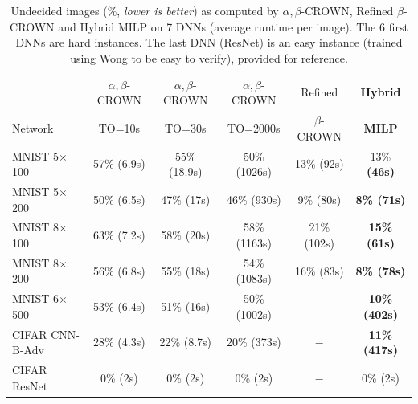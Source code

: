 \begin{table}[t!]
	\centering
		\caption{Undecided images ($\%$, {\em lower is better}) as computed by $\alpha,\beta$-CROWN, Refined $\beta$-CROWN and Hybrid MILP on 7 DNNs (average runtime per image). The 6 first DNNs are hard instances. The last DNN (ResNet) is an easy instance (trained using Wong to be easy to verify), provided for reference.
	}
	\label{table_hybrid}
	\begin{tabular}{||l||c|c|c||c||c||}
		\hline \hline
		 & $\alpha,\beta$-CROWN & $\alpha,\beta$-CROWN & $\alpha,\beta$-CROWN & Refined & \bf Hybrid \\ 
		 Network & TO=10s & TO=30s & TO=2000s & $\beta$-CROWN & \bf MILP \\ 
		\hline
		MNIST 5$\times$100 & 57\% (6.9s) & 55\% (18.9s) & 50\% (1026s) & 13\% 
		(92s) & 13\% \bf (46s) \\ \hline
		MNIST 5$\times$200 & 50\% (6.5s) & 47\% (17s) & 46\% (930s) & 9\% (80s) & \bf 8\% (71s) \\ \hline
		MNIST 8$\times$100 & 63\% (7.2s) & 58\% (20s) & 58\% (1163s) & 21\% (102s) & \bf 15\% (61s) \\ \hline
		MNIST 8$\times$200 & 56\% (6.8s) & 55\% (18s) & 54\% (1083s) & 16\% (83s) & \bf 8\% (78s) \\ \hline
		MNIST 6$\times$500 & 53\% (6.4s) & 51\% (16s) & 50\% (1002s) & $-$ & 
		\bf 10\% (402s) \\ \hline
		CIFAR CNN-B-Adv & 28\% (4.3s) & 22\% (8.7s) & 20\% (373s) & $-$ & \bf 11\% (417s) \\ \hline \hline
		CIFAR ResNet & 0\% (2s) & 0\% (2s) & 0\% (2s) & $-$ & 0\% (2s) \\ \hline \hline
	\end{tabular}
	\end{table}


